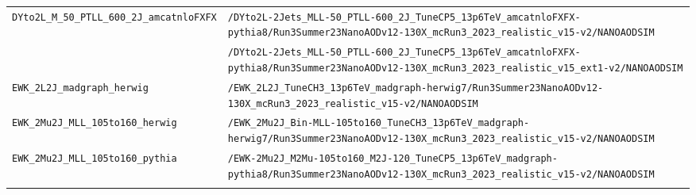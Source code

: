 \begin{longtable}{@{}>{\RaggedRight\arraybackslash}p{} >{\RaggedRight\arraybackslash}p{}@{}}
\addlinespace[2pt]
\texttt{DYto2L\_\allowbreak{}M\_\allowbreak{}50\_\allowbreak{}PTLL\_\allowbreak{}600\_\allowbreak{}2J\_\allowbreak{}amcatnloFXFX} & \texttt{/\allowbreak{}DYto2L-\allowbreak{}2Jets\_\allowbreak{}MLL-\allowbreak{}50\_\allowbreak{}PTLL-\allowbreak{}600\_\allowbreak{}2J\_\allowbreak{}TuneCP5\_\allowbreak{}13p6TeV\_\allowbreak{}amcatnloFXFX-\allowbreak{}pythia8/\allowbreak{}Run3Summer23NanoAODv12-\allowbreak{}130X\_\allowbreak{}mcRun3\_\allowbreak{}2023\_\allowbreak{}realistic\_\allowbreak{}v15-\allowbreak{}v2/\allowbreak{}NANOAODSIM} \\
 & \texttt{/\allowbreak{}DYto2L-\allowbreak{}2Jets\_\allowbreak{}MLL-\allowbreak{}50\_\allowbreak{}PTLL-\allowbreak{}600\_\allowbreak{}2J\_\allowbreak{}TuneCP5\_\allowbreak{}13p6TeV\_\allowbreak{}amcatnloFXFX-\allowbreak{}pythia8/\allowbreak{}Run3Summer23NanoAODv12-\allowbreak{}130X\_\allowbreak{}mcRun3\_\allowbreak{}2023\_\allowbreak{}realistic\_\allowbreak{}v15\_\allowbreak{}ext1-\allowbreak{}v2/\allowbreak{}NANOAODSIM} \\
\addlinespace[2pt]
\texttt{EWK\_\allowbreak{}2L2J\_\allowbreak{}madgraph\_\allowbreak{}herwig} & \texttt{/\allowbreak{}EWK\_\allowbreak{}2L2J\_\allowbreak{}TuneCH3\_\allowbreak{}13p6TeV\_\allowbreak{}madgraph-\allowbreak{}herwig7/\allowbreak{}Run3Summer23NanoAODv12-\allowbreak{}130X\_\allowbreak{}mcRun3\_\allowbreak{}2023\_\allowbreak{}realistic\_\allowbreak{}v15-\allowbreak{}v2/\allowbreak{}NANOAODSIM} \\
\addlinespace[2pt]
\texttt{EWK\_\allowbreak{}2Mu2J\_\allowbreak{}MLL\_\allowbreak{}105to160\_\allowbreak{}herwig} & \texttt{/\allowbreak{}EWK\_\allowbreak{}2Mu2J\_\allowbreak{}Bin-\allowbreak{}MLL-\allowbreak{}105to160\_\allowbreak{}TuneCH3\_\allowbreak{}13p6TeV\_\allowbreak{}madgraph-\allowbreak{}herwig7/\allowbreak{}Run3Summer23NanoAODv12-\allowbreak{}130X\_\allowbreak{}mcRun3\_\allowbreak{}2023\_\allowbreak{}realistic\_\allowbreak{}v15-\allowbreak{}v2/\allowbreak{}NANOAODSIM} \\
\addlinespace[2pt]
\texttt{EWK\_\allowbreak{}2Mu2J\_\allowbreak{}MLL\_\allowbreak{}105to160\_\allowbreak{}pythia} & \texttt{/\allowbreak{}EWK-\allowbreak{}2Mu2J\_\allowbreak{}M2Mu-\allowbreak{}105to160\_\allowbreak{}M2J-\allowbreak{}120\_\allowbreak{}TuneCP5\_\allowbreak{}13p6TeV\_\allowbreak{}madgraph-\allowbreak{}pythia8/\allowbreak{}Run3Summer23NanoAODv12-\allowbreak{}130X\_\allowbreak{}mcRun3\_\allowbreak{}2023\_\allowbreak{}realistic\_\allowbreak{}v15-\allowbreak{}v2/\allowbreak{}NANOAODSIM} \\
\addlinespace[2pt]

\end{longtable}
